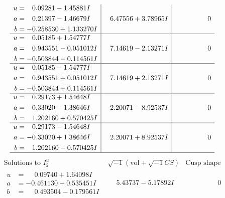 \documentclass[1p]{elsarticle_modified}
\theoremstyle{definition}
\newcommand{\I}{\sqrt{-1}}
\begin{document}
$$\begin{array}{c|c|c}
\begin{aligned}
u &= \phantom{-}0.09281 - 1.45881 I \\
a &= \phantom{-}0.21397 - 1.46679 I \\
b &= -0.258530 + 1.133270 I\end{aligned}
 & \phantom{-}6.47556 + 3.78965 I & \phantom{-0.000000 } 0 \\ \hline\begin{aligned}
u &= \phantom{-}0.05185 + 1.54777 I \\
a &= \phantom{-}0.943551 - 0.051012 I \\
b &= -0.503844 - 0.114561 I\end{aligned}
 & \phantom{-}7.14619 - 2.13271 I & \phantom{-0.000000 } 0 \\ \hline\begin{aligned}
u &= \phantom{-}0.05185 - 1.54777 I \\
a &= \phantom{-}0.943551 + 0.051012 I \\
b &= -0.503844 + 0.114561 I\end{aligned}
 & \phantom{-}7.14619 + 2.13271 I & \phantom{-0.000000 } 0 \\ \hline\begin{aligned}
u &= \phantom{-}0.29173 + 1.54648 I \\
a &= -0.33020 - 1.38646 I \\
b &= \phantom{-}1.202160 + 0.570425 I\end{aligned}
 & \phantom{-}2.20071 - 8.92537 I & \phantom{-0.000000 } 0 \\ \hline\begin{aligned}
u &= \phantom{-}0.29173 - 1.54648 I \\
a &= -0.33020 + 1.38646 I \\
b &= \phantom{-}1.202160 - 0.570425 I\end{aligned}
 & \phantom{-}2.20071 + 8.92537 I & \phantom{-0.000000 } 0\\
 \hline 
 \end{array}$$\newpage$$\begin{array}{c|c|c}  
\text{Solutions to }I^u_{2}& \I (\text{vol} + \sqrt{-1}CS) & \text{Cusp shape}\\
 \hline 
\begin{aligned}
u &= \phantom{-}0.09740 + 1.64098 I \\
a &= -0.461130 + 0.535451 I \\
b &= \phantom{-}0.493504 - 0.179561 I\end{aligned}
 & \phantom{-}5.43737 - 5.17892 I & \phantom{-0.000000 } 0 \\ \hline\begin{aligned}

\end{aligned}
\end{array}$$
\end{document}
